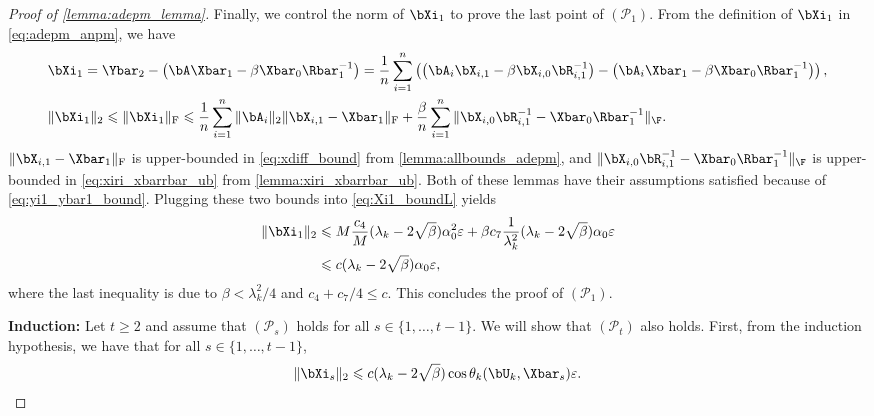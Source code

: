 \documentclass{article}
\theoremstyle{plain}
\theoremstyle{definition}
\theoremstyle{remark}
\begin{document}
\begin{proof}[Proof of \cref{lemma:adepm_lemma}]
  Finally, we control the norm of $\bXi_1$ to prove the last point of $(\mathcal{P}_1)$. From the definition of $\bXi_1$ in \eqref{eq:adepm_anpm}, we have
  \begin{align}
    & \bXi_1 = \Ybar_2 - \left( \bA \Xbar_1 - \beta \Xbar_0 \Rbar_1^{-1} \right) = \frac{1}{n} \sum_{i=1}^n \left( \left(\bA_i\bX_{i,1} - \beta \bX_{i,0} \bR_{i,1}^{-1} \right) - \left( \bA_i \Xbar_1 - \beta \Xbar_0 \Rbar_1^{-1} \right)\right), \nonumber \\
    & \Vert\bXi_1\Vert_2 \leqslant \Vert\bXi_1\Vert_\mathrm{F} \leqslant \frac{1}{n}\sum_{i=1}^n \Vert\bA_i\Vert_2 \Vert \bX_{i,1} - \Xbar_1 \Vert_\mathrm{F} + \frac{\beta}{n}\sum_{i=1}^{n} \Vert\bX_{i,0}\bR_{i,1}^{-1} - \Xbar_0 \Rbar_1^{-1} \Vert_\F. \label{eq:Xi1_boundL}
  \end{align}
  $\Vert \bX_{i,1} - \Xbar_1 \Vert_\mathrm{F}$ is upper-bounded in \eqref{eq:xdiff_bound} from \cref{lemma:allbounds_adepm}, and $\Vert\bX_{i,0}\bR_{i,1}^{-1} - \Xbar_0 \Rbar_1^{-1} \Vert_\F$ is upper-bounded in \eqref{eq:xiri_xbarrbar_ub} from \cref{lemma:xiri_xbarrbar_ub}. Both of these lemmas have their assumptions satisfied because of \eqref{eq:yi1_ybar1_bound}. Plugging these two bounds into \eqref{eq:Xi1_boundL} yields
  \begin{align*}
    \Vert \bXi_1 \Vert_2 & \leqslant M \frac{c_4}{M} (\lambda_k-2\sqrt{\beta})\alpha_0^2\varepsilon + \beta c_7 \frac{1}{\lambda_k^2} (\lambda_k - 2\sqrt{\beta}) \alpha_0 \varepsilon \\
    & \leqslant c (\lambda_k - 2\sqrt{\beta}) \alpha_0 \varepsilon,
  \end{align*}
  where the last inequality is due to $\beta < \lambda_k^2/4$ and $c_4 + c_7/4 \leqslant c$. This concludes the proof of $(\mathcal{P}_1)$.

  \textbf{Induction:} Let $t \geqslant 2$ and assume that $(\mathcal{P}_s)$ holds for all $s \in \{1, \dots, t-1\}$. We will show that $(\mathcal{P}_t)$ also holds. First, from the induction hypothesis, we have that for all $s \in \{1, \dots, t-1\}$,
  \begin{align*}
    \Vert\bXi_s\Vert_2 \leqslant c (\lambda_k - 2\sqrt{\beta}) \cos \theta_k(\bU_k, \Xbar_s) \varepsilon.
  \end{align*}


\end{proof}
\end{document}
